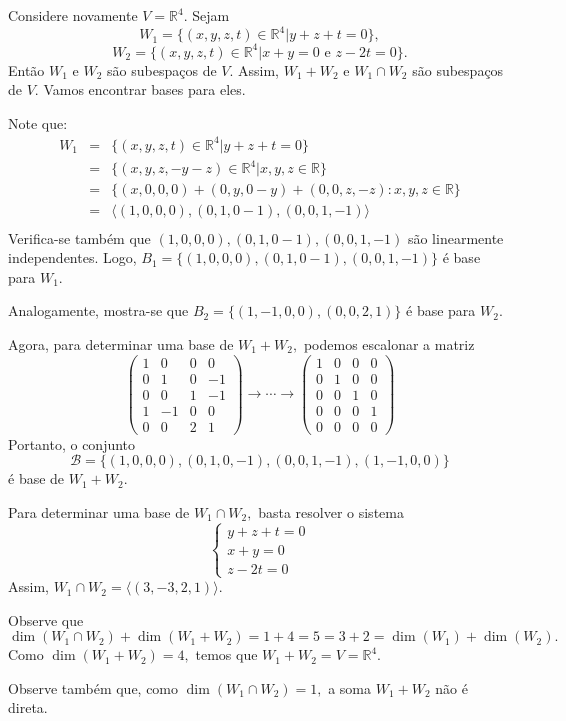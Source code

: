 \documentclass[11pt,twoside,a4paper]{book}
\begin{document}
\begin{exemplo}
Considere novamente $V = \mathbb{R}^4$. Sejam
\[
W_1 = \{(x,y,z,t) \in \mathbb{R}^4 | y + z + t = 0 \},
\]
\[
W_2 = \{(x,y,z,t) \in \mathbb{R}^4 | x +y = 0 \mbox{ e } z - 2t = 0 \}.
\]
Então $W_1$ e $W_2$ são subespaços de $V.$ Assim, $W_1 + W_2$ e $W_1 \cap W_2$ são subespaços de $V.$ Vamos encontrar bases para eles.

\medskip
\noindent
Note que:
\[
\begin{array}{lcl}
W_1 &=& \{(x,y,z,t) \in \mathbb{R}^4 | y + z + t = 0 \} \\
&=& \{(x,y,z,-y-z) \in \mathbb{R}^4 | x,y,z \in \mathbb{R} \} \\
&=& \{ (x,0,0,0) + (0,y,0-y) + (0,0,z,-z) : x,y,z \in \mathbb{R} \} \\
&=& \langle (1,0,0,0), (0,1,0-1), (0,0,1,-1) \rangle\\
\end{array}
\]
Verifica-se também que $(1,0,0,0), (0,1,0-1), (0,0,1,-1)$ são linearmente independentes. Logo, $B_1 = \{ (1,0,0,0), (0,1,0-1), (0,0,1,-1) \}$ é base para $W_1.$

\medskip
\noindent
Analogamente, mostra-se que $B_2 = \{ (1,-1,0,0), (0,0,2,1) \}$ é base para $W_2.$

\medskip
\noindent
Agora, para determinar uma base de $W_1 + W_2,$ podemos escalonar a matriz
\[
\left( \begin{array}{cccc}
1 & 0 & 0 & 0\\
0 & 1 & 0 & -1 \\
0 & 0 & 1 & -1 \\
1 & -1 & 0 & 0\\
0 & 0 & 2 & 1

\end{array} \right) \rightarrow \cdots \rightarrow \left( \begin{array}{cccc}
1 & 0 & 0 & 0\\
0 & 1 & 0 & 0 \\
0 & 0 & 1 & 0 \\
0& 0& 0 & 1\\
0 & 0 & 0 & 0

\end{array} \right)
\]
Portanto, o conjunto
\[
\mathcal{B} = \{ (1,0,0,0), (0,1,0,-1),(0,0,1,-1),(1,-1,0,0) \}\]
é base de $W_1 + W_2.$

\medskip
\noindent
Para determinar uma base de $W_1 \cap W_2,$ basta resolver o sistema
\[
\left\{ \begin{array}{l}
y+z+t = 0 \\x+y = 0 \\z - 2t = 0
\end{array} \right.
\]
Assim, $W_1 \cap W_2 = \langle (3,-3,2,1) \rangle.$

\medskip
\noindent
Observe que
\[
\dim(W_1 \cap W_2) + \dim(W_1 + W_2) = 1 + 4 = 5 = 3 + 2 = \dim(W_1) + \dim(W_2).
\]
Como $\dim(W_1 + W_2) = 4,$ temos que $W_1 + W_2 = V = \mathbb{R}^4.$

\medskip
\noindent
Observe também que, como $\dim(W_1 \cap W_2) = 1,$ a soma $W_1 + W_2$ não é direta. 
\end{exemplo}
\end{document}
